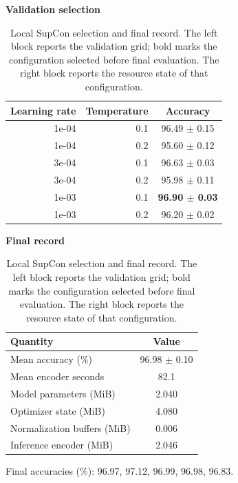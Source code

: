 \begin{table}[H]
\centering
\footnotesize
\caption{Local SupCon selection and final record. The left block reports the validation grid; bold marks the configuration selected before final evaluation. The right block reports the resource state of that configuration.}
\label{tab:local-supcon-record}
\begin{minipage}[t]{0.48\linewidth}
\centering
\textbf{Validation selection}\par\smallskip
\begin{tabular}{rrc}
\toprule
Learning rate & Temperature & Accuracy \\
\midrule
1e-04 & 0.1 & 96.49 $\pm$ 0.15 \\
1e-04 & 0.2 & 95.60 $\pm$ 0.12 \\
3e-04 & 0.1 & 96.63 $\pm$ 0.03 \\
3e-04 & 0.2 & 95.98 $\pm$ 0.11 \\
1e-03 & 0.1 & \textbf{96.90 $\pm$ 0.03} \\
1e-03 & 0.2 & 96.20 $\pm$ 0.02 \\
\bottomrule
\end{tabular}
\end{minipage}\hfill
\begin{minipage}[t]{0.48\linewidth}
\centering
\textbf{Final record}\par\smallskip
\begin{tabular}{lc}
\toprule
Quantity & Value \\
\midrule
Mean accuracy (\%) & 96.98 $\pm$ 0.10 \\
Mean encoder seconds & 82.1 \\
Model parameters (MiB) & 2.040 \\
Optimizer state (MiB) & 4.080 \\
Normalization buffers (MiB) & 0.006 \\
Inference encoder (MiB) & 2.046 \\
\bottomrule
\end{tabular}
\end{minipage}
\par\smallskip
Final accuracies (\%): 96.97, 97.12, 96.99, 96.98, 96.83.
\end{table}
